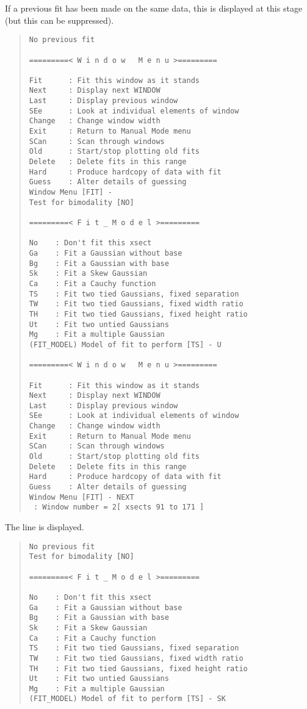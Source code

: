 If a previous fit has been made on the same data, this is displayed
at this stage (but this can be suppressed).
\begin{quote}\begin{verbatim}
No previous fit
 
=========< W i n d o w   M e n u >=========
 
Fit      : Fit this window as it stands
Next     : Display next WINDOW
Last     : Display previous window
SEe      : Look at individual elements of window
Change   : Change window width
Exit     : Return to Manual Mode menu
SCan     : Scan through windows
Old      : Start/stop plotting old fits
Delete   : Delete fits in this range
Hard     : Produce hardcopy of data with fit
Guess    : Alter details of guessing
Window Menu [FIT] -
Test for bimodality [NO]
 
=========< F i t _ M o d e l >=========
 
No    : Don't fit this xsect
Ga    : Fit a Gaussian without base
Bg    : Fit a Gaussian with base
Sk    : Fit a Skew Gaussian
Ca    : Fit a Cauchy function
TS    : Fit two tied Gaussians, fixed separation
TW    : Fit two tied Gaussians, fixed width ratio
TH    : Fit two tied Gaussians, fixed height ratio
Ut    : Fit two untied Gaussians
Mg    : Fit a multiple Gaussian
(FIT_MODEL) Model of fit to perform [TS] - U
 
=========< W i n d o w   M e n u >=========
 
Fit      : Fit this window as it stands
Next     : Display next WINDOW
Last     : Display previous window
SEe      : Look at individual elements of window
Change   : Change window width
Exit     : Return to Manual Mode menu
SCan     : Scan through windows
Old      : Start/stop plotting old fits
Delete   : Delete fits in this range
Hard     : Produce hardcopy of data with fit
Guess    : Alter details of guessing
Window Menu [FIT] - NEXT
 : Window number = 2[ xsects 91 to 171 ]
\end{verbatim}\end{quote}
The line is displayed.
\begin{quote}\begin{verbatim}
No previous fit
Test for bimodality [NO]
 
=========< F i t _ M o d e l >=========
 
No    : Don't fit this xsect
Ga    : Fit a Gaussian without base
Bg    : Fit a Gaussian with base
Sk    : Fit a Skew Gaussian
Ca    : Fit a Cauchy function
TS    : Fit two tied Gaussians, fixed separation
TW    : Fit two tied Gaussians, fixed width ratio
TH    : Fit two tied Gaussians, fixed height ratio
Ut    : Fit two untied Gaussians
Mg    : Fit a multiple Gaussian
(FIT_MODEL) Model of fit to perform [TS] - SK
\end{verbatim}\end{quote}
